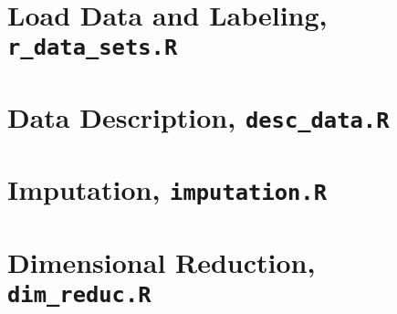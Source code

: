 \documentclass[../thesis.tex]{subfiles}
\begin{document}
\section{Load Data and Labeling, \texttt{r\_data\_sets.R}}
\label{sec:load_data}



\section{Data Description, \texttt{desc\_data.R}}
\label{sec:app_desc_stat}



\section{Imputation, \texttt{imputation.R}}
\label{sec:app_impu}



\section{Dimensional Reduction, \texttt{dim\_reduc.R}}
\label{sec:dim_red}
\end{document}
